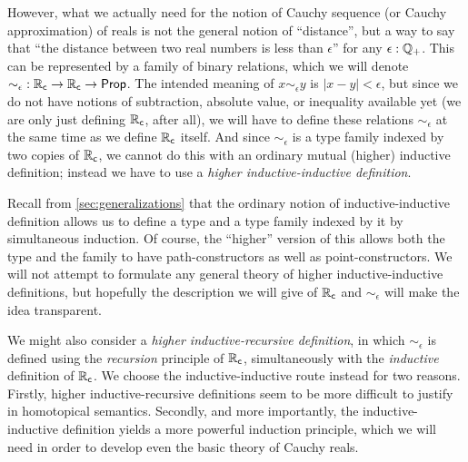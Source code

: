 However, what we actually need for the notion of Cauchy sequence (or Cauchy approximation) of reals is not the general notion of ``distance'', but a way to say that ``the distance between two real numbers is less than $\epsilon$'' for any $\epsilon:\mathbb{Q}_{+}$.
This can be represented by a family of binary relations, which we will denote $\mathord{\sim_\epsilon} : \mathbb{R}_\mathsf{c}\to\mathbb{R}_\mathsf{c}\to \mathsf{Prop}$.
The intended meaning of $x \sim_\epsilon y$ is $|x - y| < \epsilon$, but since we do not have notions of subtraction, absolute value, or inequality available yet (we are only just defining $\mathbb{R}_\mathsf{c}$, after all), we will have to define these relations $\sim_\epsilon$ at the same time as we define $\mathbb{R}_\mathsf{c}$ itself.
And since $\sim_\epsilon$ is a type family indexed by two copies of $\mathbb{R}_\mathsf{c}$, we cannot do this with an ordinary mutual (higher) inductive definition; instead we have to use a \emph{higher inductive-inductive definition}.

Recall from \autoref{sec:generalizations} that the ordinary notion of inductive-inductive definition allows us to define a type and a type family indexed by it by simultaneous induction.
Of course, the ``higher'' version of this allows both the type and the family to have path-constructors as well as point-constructors.
We will not attempt to formulate any general theory of higher inductive-inductive definitions, but hopefully the description we will give of $\mathbb{R}_\mathsf{c}$ and $\sim_\epsilon$ will make the idea transparent.

\begin{rmk}
  We might also consider a \emph{higher inductive-recursive definition}, in which $\sim_\epsilon$ is defined using the \emph{recursion} principle of $\mathbb{R}_\mathsf{c}$, simultaneously with the \emph{inductive} definition of $\mathbb{R}_\mathsf{c}$.
  We choose the inductive-inductive route instead for two reasons.
  Firstly, higher inductive-recursive definitions seem to be more difficult to justify in homotopical semantics.
  Secondly, and more importantly, the inductive-inductive definition yields a more powerful induction principle, which we will need in order to develop even the basic theory of Cauchy reals.
\end{rmk}

